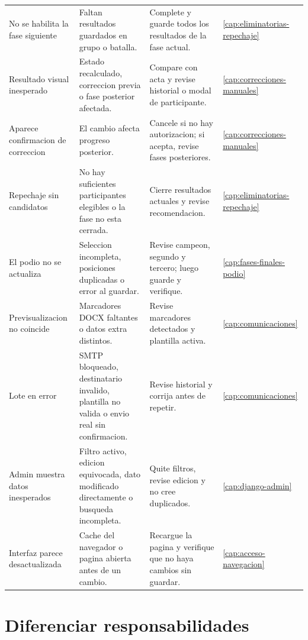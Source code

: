 \begin{longtable}{p{3.0cm}p{3.8cm}p{4.4cm}p{1.9cm}}
No se habilita la fase siguiente & Faltan resultados guardados en grupo o batalla. & Complete y guarde todos los resultados de la fase actual. & \cref{cap:eliminatorias-repechaje}\\
Resultado visual inesperado & Estado recalculado, correccion previa o fase posterior afectada. & Compare con acta y revise historial o modal de participante. & \cref{cap:correcciones-manuales}\\
Aparece confirmacion de correccion & El cambio afecta progreso posterior. & Cancele si no hay autorizacion; si acepta, revise fases posteriores. & \cref{cap:correcciones-manuales}\\
Repechaje sin candidatos & No hay suficientes participantes elegibles o la fase no esta cerrada. & Cierre resultados actuales y revise recomendacion. & \cref{cap:eliminatorias-repechaje}\\
El podio no se actualiza & Seleccion incompleta, posiciones duplicadas o error al guardar. & Revise campeon, segundo y tercero; luego guarde y verifique. & \cref{cap:fases-finales-podio}\\
Previsualizacion no coincide & Marcadores DOCX faltantes o datos extra distintos. & Revise marcadores detectados y plantilla activa. & \cref{cap:comunicaciones}\\
Lote en error & SMTP bloqueado, destinatario invalido, plantilla no valida o envio real sin confirmacion. & Revise historial y corrija antes de repetir. & \cref{cap:comunicaciones}\\
Admin muestra datos inesperados & Filtro activo, edicion equivocada, dato modificado directamente o busqueda incompleta. & Quite filtros, revise edicion y no cree duplicados. & \cref{cap:django-admin}\\
Interfaz parece desactualizada & Cache del navegador o pagina abierta antes de un cambio. & Recargue la pagina y verifique que no haya cambios sin guardar. & \cref{cap:acceso-navegacion}\\
\bottomrule
\end{longtable}

\section{Diferenciar responsabilidades}

